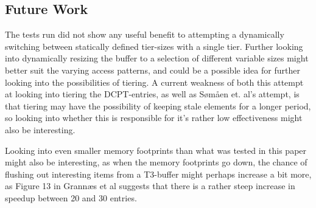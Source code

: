 \subsection{Future Work}
The tests run did not show any useful benefit to attempting a dynamically switching
between statically defined tier-sizes with a single tier. Further looking into dynamically
resizing the buffer to a selection of different variable sizes might better suit the varying
access patterns, and could be a possible idea for further looking into the possibilities of tiering.
A current weakness of both this attempt at looking into tiering the DCPT-entries, as well as Sømåen
et. al's attempt, is that tiering may have the possibility of keeping stale elements for a longer period,
so looking into whether this is responsible for it's rather low effectiveness might also be interesting.

Looking into even smaller memory footprints than what was tested in this paper might also be interesting,
as when the memory footprints go down, the chance of flushing out interesting items from a T3-buffer might
perhaps increase a bit more, as Figure 13 in Grannæs et al suggests that there is a rather steep increase in
speedup between 20 and 30 entries.

